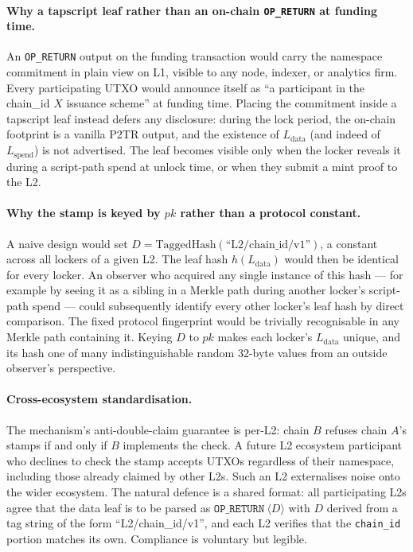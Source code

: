\documentclass[11pt,a4paper]{article}
\begin{document}
\paragraph{Why a tapscript leaf rather than an on-chain \texttt{OP\_RETURN} at funding time.} An \texttt{OP\_RETURN} output on the funding transaction would carry the namespace commitment in plain view on L1, visible to any node, indexer, or analytics firm. Every participating UTXO would announce itself as ``a participant in the chain\_id $X$ issuance scheme'' at funding time. Placing the commitment inside a tapscript leaf instead defers any disclosure: during the lock period, the on-chain footprint is a vanilla P2TR output, and the existence of $L_{\mathrm{data}}$ (and indeed of $L_{\mathrm{spend}}$) is not advertised. The leaf becomes visible only when the locker reveals it during a script-path spend at unlock time, or when they submit a mint proof to the L2.

\paragraph{Why the stamp is keyed by $pk$ rather than a protocol constant.} A naive design would set $D = \mathrm{TaggedHash}(\text{``L2/chain\_id/v1''})$, a constant across all lockers of a given L2. The leaf hash $h(L_{\mathrm{data}})$ would then be identical for every locker. An observer who acquired any single instance of this hash --- for example by seeing it as a sibling in a Merkle path during another locker's script-path spend --- could subsequently identify every other locker's leaf hash by direct comparison. The fixed protocol fingerprint would be trivially recognisable in any Merkle path containing it. Keying $D$ to $pk$ makes each locker's $L_{\mathrm{data}}$ unique, and its hash one of many indistinguishable random 32-byte values from an outside observer's perspective.

\paragraph{Cross-ecosystem standardisation.} The mechanism's anti-double-claim guarantee is per-L2: chain $B$ refuses chain $A$'s stamps if and only if $B$ implements the check. A future L2 ecosystem participant who declines to check the stamp accepts UTXOs regardless of their namespace, including those already claimed by other L2s. Such an L2 externalises noise onto the wider ecosystem. The natural defence is a shared format: all participating L2s agree that the data leaf is to be parsed as $\texttt{OP\_RETURN}\ \langle D\rangle$ with $D$ derived from a tag string of the form ``L2/chain\_id/v1'', and each L2 verifies that the \texttt{chain\_id} portion matches its own. Compliance is voluntary but legible.
\end{document}
